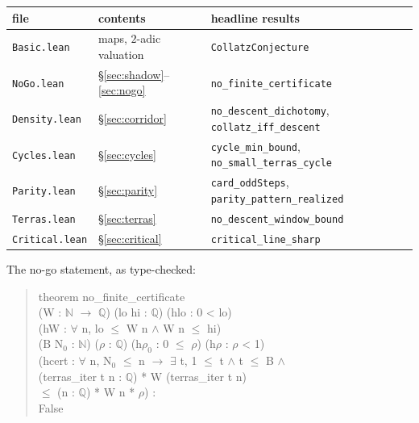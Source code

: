 \documentclass[11pt]{article}
\newcommand{\N}{\mathbb{N}}
\newcommand{\Q}{\mathbb{Q}}
\newcommand{\code}[1]{\texttt{#1}}
\newenvironment{leanblock}
  {\begin{quote}\ttfamily\small\setlength{\parindent}{0pt}}
  {\end{quote}}
\begin{document}
\begin{center}
\begin{tabular}{lll}
\toprule
file & contents & headline results\\
\midrule
\code{Basic.lean}    & maps, $2$-adic valuation & \code{CollatzConjecture}\\
\code{NoGo.lean}     & \S\ref{sec:shadow}--\ref{sec:nogo} & \code{no\_finite\_certificate}\\
\code{Density.lean}  & \S\ref{sec:corridor} & \code{no\_descent\_dichotomy}, \code{collatz\_iff\_descent}\\
\code{Cycles.lean}   & \S\ref{sec:cycles} & \code{cycle\_min\_bound}, \code{no\_small\_terras\_cycle}\\
\code{Parity.lean}   & \S\ref{sec:parity} & \code{card\_oddSteps}, \code{parity\_pattern\_realized}\\
\code{Terras.lean}   & \S\ref{sec:terras} & \code{no\_descent\_window\_bound}\\
\code{Critical.lean} & \S\ref{sec:critical} & \code{critical\_line\_sharp}\\
\bottomrule
\end{tabular}
\end{center}

The no-go statement, as type-checked:

\begin{leanblock}
theorem no\_finite\_certificate\\
\hspace*{1.5em}(W : $\N$ $\to$ $\Q$) (lo hi : $\Q$) (hlo : 0 < lo)\\
\hspace*{1.5em}(hW : $\forall$ n, lo $\le$ W n $\wedge$ W n $\le$ hi)\\
\hspace*{1.5em}(B N$_0$ : $\N$) ($\rho$ : $\Q$) (h$\rho_0$ : 0 $\le$ $\rho$) (h$\rho$ : $\rho$ < 1)\\
\hspace*{1.5em}(hcert : $\forall$ n, N$_0$ $\le$ n $\to$ $\exists$ t, 1 $\le$ t $\wedge$ t $\le$ B $\wedge$\\
\hspace*{3em}(terras\_iter t n : $\Q$) * W (terras\_iter t n)\\
\hspace*{4.5em}$\le$ (n : $\Q$) * W n * $\rho$) :\\
\hspace*{1.5em}False
\end{leanblock}
\end{document}

